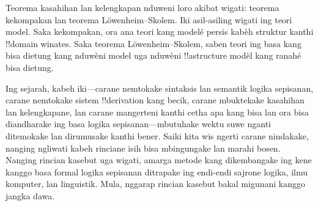 \documentclass[../../../include/open-logic-section]{subfiles}
\begin{document}
Teorema kasahihan lan kelengkapan nduweni loro akibat wigati: teorema
kekompakan lan teorema L\"owenheim--Skolem. Iki asil-asiling wigati ing
teori model. Saka kekompakan, ora ana teori kang modelé persis
kabèh struktur kanthi !!{domain} winates. Saka teorema
L\"owenheim--Skolem, saben teori ing basa kang bisa dietung kang
nduwèni model uga nduwèni !!a{structure} modèl kang ranahé bisa
dietung.

Ing sejarah, kabeh iki---carane nemtokake sintaksis lan semantik logika
sepisanan, carane nemtokake sistem !!{derivation} kang becik, carane
mbuktekake kasahihan lan kelengkapane, lan carane mangerteni kanthi
cetha apa kang bisa lan ora bisa diandharake ing basa logika
sepisanan---mbutuhake wektu suwe nganti ditemokake lan dirumusake kanthi
bener. Saiki kita wis ngerti carane nindakake, nanging ngliwati kabeh
rinciane isih bisa mbingungake lan marahi bosen. Nanging rincian kasebut
uga wigati, amarga metode kang dikembangake ing kene kanggo basa formal
logika sepisanan ditrapake ing endi-endi sajrone logika, ilmu komputer,
lan linguistik. Mula, nggarap rincian kasebut bakal migunani kanggo
jangka dawa.
\end{document}
